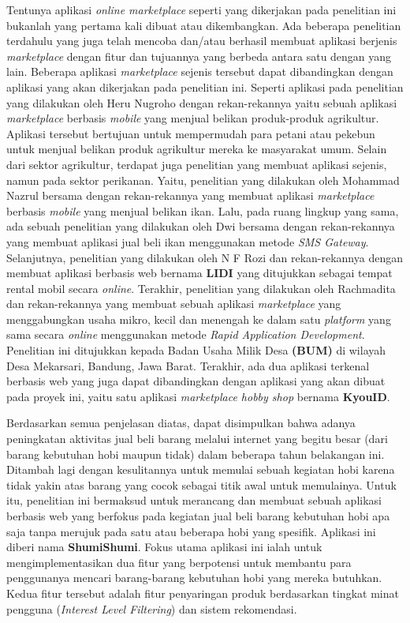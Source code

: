 \documentclass[a4paper]{article}
\begin{document}
Tentunya aplikasi \textit{online marketplace} seperti yang dikerjakan pada penelitian ini bukanlah yang pertama kali dibuat atau dikembangkan. Ada beberapa penelitian terdahulu yang juga telah mencoba dan/atau berhasil membuat aplikasi berjenis \textit{marketplace} dengan fitur dan tujuannya yang berbeda antara satu dengan yang lain. Beberapa aplikasi \textit{marketplace} sejenis tersebut dapat dibandingkan dengan aplikasi yang akan dikerjakan pada penelitian ini. Seperti aplikasi pada penelitian yang dilakukan oleh Heru Nugroho dengan rekan-rekannya yaitu sebuah aplikasi \textit{marketplace} berbasis \textit{mobile} yang menjual belikan produk-produk agrikultur. Aplikasi tersebut bertujuan untuk mempermudah para petani atau pekebun untuk menjual belikan produk agrikultur mereka ke masyarakat umum\autocite{agriculture-marketplace}. Selain dari sektor agrikultur, terdapat juga penelitian yang membuat aplikasi sejenis, namun pada sektor perikanan. Yaitu, penelitian yang dilakukan oleh Mohammad Nazrul bersama dengan rekan-rekannya yang membuat aplikasi \textit{marketplace} berbasis \textit{mobile} yang menjual belikan ikan\autocite{fishes-marketplace}. Lalu, pada ruang lingkup yang sama, ada sebuah penelitian yang dilakukan oleh Dwi bersama dengan rekan-rekannya yang membuat aplikasi jual beli ikan menggunakan metode \textit{SMS Gateway}\autocite{c2c-fish-marketplace}. Selanjutnya, penelitian yang dilakukan oleh N F Rozi dan rekan-rekannya dengan membuat aplikasi berbasis web bernama \textbf{LIDI} yang ditujukkan sebagai tempat rental mobil secara \textit{online}\autocite{lidi-car-rental}. Terakhir, penelitian yang dilakukan oleh Rachmadita dan rekan-rekannya yang membuat sebuah aplikasi \textit{marketplace} yang menggabungkan usaha mikro, kecil dan menengah ke dalam satu \textit{platform} yang sama secara \textit{online} menggunakan metode \textit{Rapid Application Development}. Penelitian ini ditujukkan kepada Badan Usaha Milik Desa \textbf{(BUM)} di wilayah Desa Mekarsari, Bandung, Jawa Barat\autocite{bum-mekarsari}. Terakhir, ada dua aplikasi terkenal berbasis web yang juga dapat dibandingkan dengan aplikasi yang akan dibuat pada proyek ini, yaitu satu aplikasi \textit{marketplace hobby shop} bernama \textbf{KyouID}.

Berdasarkan semua penjelasan diatas, dapat disimpulkan bahwa adanya peningkatan aktivitas jual beli barang melalui internet yang begitu besar (dari barang kebutuhan hobi maupun tidak) dalam beberapa tahun belakangan ini. Ditambah lagi dengan kesulitannya untuk memulai sebuah kegiatan hobi karena tidak yakin atas barang yang cocok sebagai titik awal untuk memulainya. Untuk itu, penelitian ini bermaksud untuk merancang dan membuat sebuah aplikasi berbasis web yang berfokus pada kegiatan jual beli barang kebutuhan hobi apa saja tanpa merujuk pada satu atau beberapa hobi yang spesifik. Aplikasi ini diberi nama \textbf{ShumiShumi}. Fokus utama aplikasi ini ialah untuk mengimplementasikan dua fitur yang berpotensi untuk membantu para penggunanya mencari barang-barang kebutuhan hobi yang mereka butuhkan. Kedua fitur tersebut adalah fitur penyaringan produk berdasarkan tingkat minat pengguna (\textit{Interest Level Filtering}) dan sistem rekomendasi.
\end{document}
